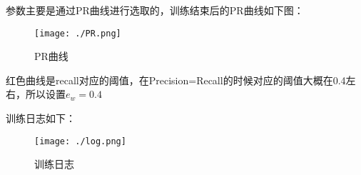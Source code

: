 \documentclass{article}
\begin{document}
参数主要是通过PR曲线进行选取的，训练结束后的PR曲线如下图：

\begin{figure}[H]
	\centering
	\texttt{[image: ./PR.png]}
	\caption{PR曲线} \label{fig:aa}
\end{figure}

红色曲线是recall对应的阈值，在Precision=Recall的时候对应的阈值大概在0.4左右，所以设置$e_w=0.4$

训练日志如下：

\begin{figure}[H]
	\centering
	\texttt{[image: ./log.png]}
	\caption{训练日志} \label{fig:aa}
\end{figure}
\end{document}
